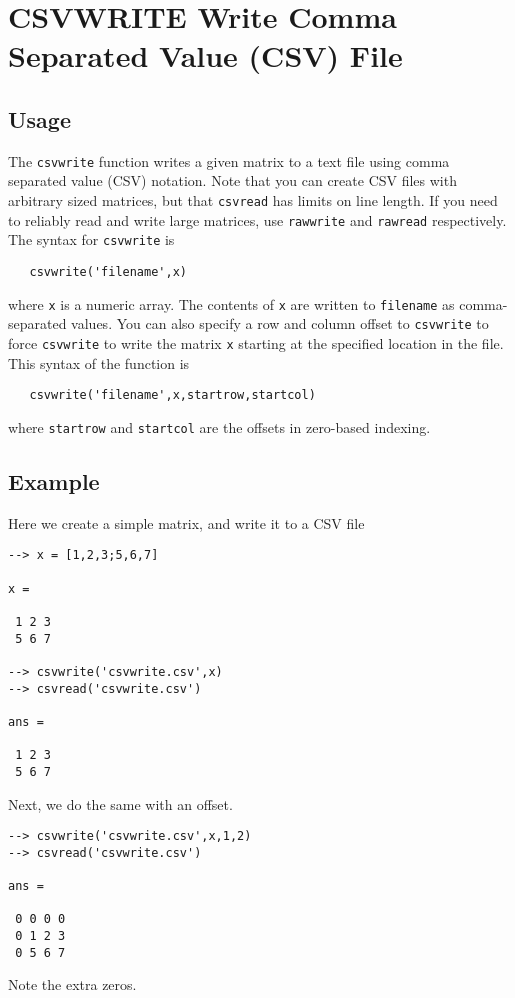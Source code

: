 \section{CSVWRITE Write Comma Separated Value (CSV) File}

\subsection{Usage}

The \verb|csvwrite| function writes a given matrix to a text
file using comma separated value (CSV) notation.  Note that
you can create CSV files with arbitrary sized matrices, but
that \verb|csvread| has limits on line length.  If you need to
reliably read and write large matrices, use \verb|rawwrite| and
\verb|rawread| respectively.  The syntax for \verb|csvwrite| is 
\begin{verbatim}
   csvwrite('filename',x)
\end{verbatim}
where \verb|x| is a numeric array.  The contents of \verb|x| are written
to \verb|filename| as comma-separated values.  You can also specify
a row and column offset to \verb|csvwrite| to force \verb|csvwrite| to
write the matrix \verb|x| starting at the specified location in the 
file.  This syntax of the function is
\begin{verbatim}
   csvwrite('filename',x,startrow,startcol)
\end{verbatim}
where \verb|startrow| and \verb|startcol| are the offsets in zero-based
indexing.  
\subsection{Example}

Here we create a simple matrix, and write it to a CSV file
\begin{verbatim}
--> x = [1,2,3;5,6,7]

x = 

 1 2 3 
 5 6 7 

--> csvwrite('csvwrite.csv',x)
--> csvread('csvwrite.csv')

ans = 

 1 2 3 
 5 6 7 
\end{verbatim}
Next, we do the same with an offset.
\begin{verbatim}
--> csvwrite('csvwrite.csv',x,1,2)
--> csvread('csvwrite.csv')

ans = 

 0 0 0 0 
 0 1 2 3 
 0 5 6 7 
\end{verbatim}
Note the extra zeros.
